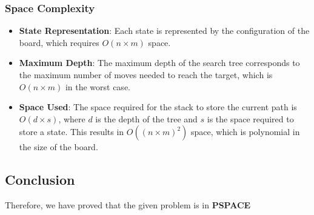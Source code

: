 \documentclass{article}
\begin{document}
\subsubsection*{Space Complexity}
\begin{itemize}
    \item \textbf{State Representation}: Each state is represented by the configuration of the board, which requires \(O(n \times m)\) space.
    \item \textbf{Maximum Depth}: The maximum depth of the search tree corresponds to the maximum number of moves needed to reach the target, which is \(O(n \times m)\) in the worst case.
    \item \textbf{Space Used}: The space required for the stack to store the current path is \(O(d \times s)\), where \(d\) is the depth of the tree and \(s\) is the space required to store a state. This results in \(O((n \times m)^2)\) space, which is polynomial in the size of the board.
\end{itemize}

\subsection*{Conclusion}
Therefore, we have proved that the given problem is in \textbf{PSPACE}





\end{document}
